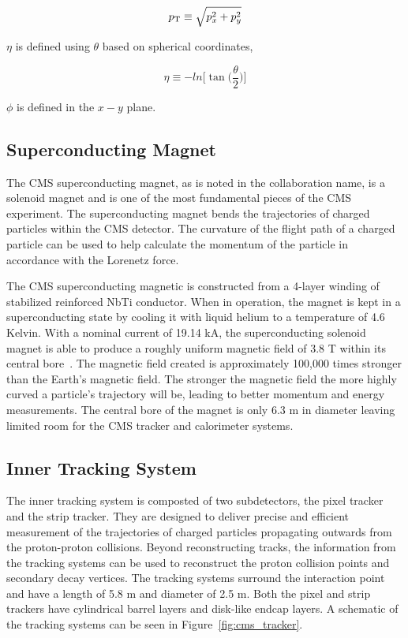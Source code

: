 \begin{equation}
p_\mathrm{T} \equiv \sqrt{p^{2}_{x} + p^{2}_{y}}
\end{equation}

$\eta$ is defined using $\theta$ based on spherical coordinates,

\begin{equation}
\eta \equiv -ln\bigg[\tan\bigg(\frac{\theta}{2}\bigg)\bigg]
\end{equation}

$\phi$ is defined in the $x-y$ plane.



\subsection{Superconducting Magnet}
The CMS superconducting magnet, as is noted in the collaboration name, is 
a solenoid magnet and is one of the most fundamental
pieces of the CMS experiment. The superconducting magnet bends the trajectories of charged particles
within the CMS detector. The curvature of the flight path of a charged particle can be used to help
calculate the momentum of the particle in accordance with the Lorenetz force.

The CMS superconducting magnetic is constructed from a 4-layer winding of stabilized
reinforced NbTi conductor. When in operation, the magnet is kept in a superconducting state
by cooling it with liquid helium to a temperature of 4.6 Kelvin. With a nominal current
of 19.14 kA, the superconducting solenoid magnet is able to produce a roughly uniform
magnetic field of 3.8 T within its central bore~\cite{Chatrchyan:2008zzk}. The magnetic field created is approximately
100,000 times stronger than the Earth's magnetic field. The stronger the magnetic field the
more highly curved a particle's trajectory will be, leading to better momentum and energy measurements.
The central bore of the magnet is only 6.3 m in diameter
leaving limited room for the CMS tracker and calorimeter systems.



\subsection{Inner Tracking System}
The inner tracking system is composted of two subdetectors, the pixel tracker and the
strip tracker. They are designed to deliver precise and efficient measurement of
the trajectories of charged particles propagating outwards from the 
proton-proton collisions. Beyond reconstructing tracks, the information from the
tracking systems can be used to reconstruct the 
proton collision points and secondary decay vertices. The
tracking systems surround the interaction point and have a length of 5.8 m and 
diameter of 2.5 m. Both the pixel and strip trackers have cylindrical barrel
layers and disk-like endcap layers. A schematic of the tracking systems
can be seen in Figure~\ref{fig:cms_tracker}.

